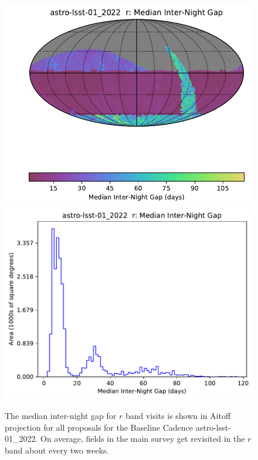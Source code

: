 \documentclass[DM,lsstdraft,authoryear,toc]{lsstdoc}
\begin{document}
\begin{figure}[h!]
\vskip -0.0in
\includegraphics[angle=0,width=0.49\hsize,clip]{figures/astro-lsst-01_2022_Median_Inter-Night_Gap_r_HEAL_SkyMap.pdf}
\includegraphics[angle=0,width=0.49\hsize,clip]{figures/astro-lsst-01_2022_Median_Inter-Night_Gap_r_HEAL_Histogram.pdf}
\vskip -0.1in
\caption{The median inter-night gap for $r$ band visits is shown in Aitoff projection
for all proposals for the Baseline Cadence astro-lsst-01\_2022.
On average, fields in the main survey get revisited in the $r$ band about every two weeks.}
\label{fig:baseline_Gapr}
\end{figure}
\end{document}
